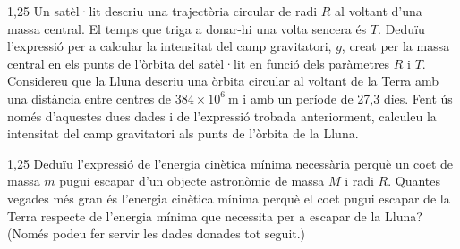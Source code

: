 \begin{apartat}{1,25}
Un satèl·lit descriu una trajectòria circular de radi $R$ al voltant d'una massa central. El temps que triga a donar-hi una volta sencera és $T$. Deduïu l'expressió per a calcular la intensitat del camp gravitatori, $g$, creat per la massa central en els punts de l'òrbita del satèl·lit en funció dels paràmetres $R$ i $T$. Considereu que la Lluna descriu una òrbita circular al voltant de la Terra amb una distància entre centres de $384\times 10^{6}\ \mathrm{m}$ i amb un període de 27,3 dies. Fent ús només d'aquestes dues dades i de l'expressió trobada anteriorment, calculeu la intensitat del camp gravitatori als punts de l'òrbita de la Lluna.
\end{apartat}

\begin{apartat}{1,25}
Deduïu l'expressió de l'energia cinètica mínima necessària perquè un coet de massa $m$ pugui escapar d'un objecte astronòmic de massa $M$ i radi $R$. Quantes vegades més gran és l'energia cinètica mínima perquè el coet pugui escapar de la Terra respecte de l'energia mínima que necessita per a escapar de la Lluna? (Només podeu fer servir les dades donades tot seguit.)
\end{apartat}

